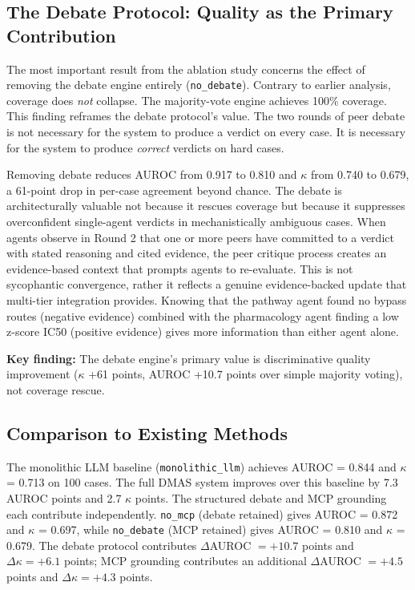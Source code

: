 \documentclass{article}
\begin{document}
\subsection{The Debate Protocol: Quality as the Primary Contribution}

The most important result from the ablation study concerns the effect of removing the debate engine entirely (\texttt{no\_debate}). Contrary to earlier analysis, coverage does \emph{not} collapse. The majority-vote engine achieves 100\% coverage. This finding reframes the debate protocol's value. The two rounds of peer debate is not necessary for the system to produce a verdict on every case. It is necessary for the system to produce \textit{correct} verdicts on hard cases.

Removing debate reduces AUROC from 0.917 to 0.810 and $\kappa$ from 0.740 to 0.679, a 61-point drop in per-case agreement beyond chance. The debate is architecturally valuable not because it rescues coverage but because it suppresses overconfident single-agent verdicts in mechanistically ambiguous cases. When agents observe in Round 2 that one or more peers have committed to a verdict with stated reasoning and cited evidence, the peer critique process creates an evidence-based context that prompts agents to re-evaluate. This is not sycophantic convergence, rather it reflects a genuine evidence-backed update that multi-tier integration provides. Knowing that the pathway agent found no bypass routes (negative evidence) combined with the pharmacology agent finding a low z-score IC50 (positive evidence) gives more information than either agent alone.

\textbf{Key finding:} The debate engine's primary value is discriminative quality improvement ($\kappa$ +61 points, AUROC +10.7 points over simple majority voting), not coverage rescue.

\subsection{Comparison to Existing Methods}

The monolithic LLM baseline (\texttt{monolithic\_llm}) achieves AUROC = 0.844 and $\kappa$ = 0.713 on 100 cases. The full DMAS system improves over this baseline by 7.3 AUROC points and 2.7 $\kappa$ points. The structured debate and MCP grounding each contribute independently. \texttt{no\_mcp} (debate retained) gives AUROC = 0.872 and $\kappa$ = 0.697, while \texttt{no\_debate} (MCP retained) gives AUROC = 0.810 and $\kappa$ = 0.679. The debate protocol contributes $\Delta$AUROC $= +10.7$ points and $\Delta\kappa = +6.1$ points; MCP grounding contributes an additional $\Delta$AUROC $= +4.5$ points and $\Delta\kappa = +4.3$ points.
\end{document}
